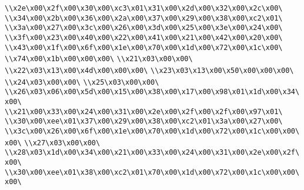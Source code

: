 \verb|\\x2e\x00\x2f\x00\x30\x00\xc3\x01\x31\x00\x2d\x00\x32\x00\x2c\x00\|\newline
\verb|\\x34\x00\x2b\x00\x36\x00\x2a\x00\x37\x00\x29\x00\x38\x00\xc2\x01\|\newline
\verb|\\x3a\x00\x27\x00\x3c\x00\x26\x00\x3d\x00\x25\x00\x3e\x00\x24\x00\|\newline
\verb|\\x3f\x00\x23\x00\x40\x00\x22\x00\x41\x00\x21\x00\x42\x00\x20\x00\|\newline
\verb|\\x43\x00\x1f\x00\x6f\x00\x1e\x00\x70\x00\x1d\x00\x72\x00\x1c\x00\|\newline
\verb|\\x74\x00\x1b\x00\x00\x00\|\newline
\verb|\\x21\x03\x00\x00\|\newline
\verb|\\x22\x03\x13\x00\x4d\x00\x00\x00\|\newline
\verb|\\x23\x03\x13\x00\x50\x00\x00\x00\|\newline
\verb|\\x24\x03\x00\x00\|\newline
\verb|\\x25\x03\x00\x00\|\newline
\verb|\\x26\x03\x06\x00\x5d\x00\x15\x00\x38\x00\x17\x00\x98\x01\x1d\x00\x34\x00\|\newline
\verb|\\x21\x00\x33\x00\x24\x00\x31\x00\x2e\x00\x2f\x00\x2f\x00\x97\x01\|\newline
\verb|\\x30\x00\xee\x01\x37\x00\x29\x00\x38\x00\xc2\x01\x3a\x00\x27\x00\|\newline
\verb|\\x3c\x00\x26\x00\x6f\x00\x1e\x00\x70\x00\x1d\x00\x72\x00\x1c\x00\x00\x00\|\newline
\verb|\\x27\x03\x00\x00\|\newline
\verb|\\x28\x03\x1d\x00\x34\x00\x21\x00\x33\x00\x24\x00\x31\x00\x2e\x00\x2f\x00\|\newline
\verb|\\x30\x00\xee\x01\x38\x00\xc2\x01\x70\x00\x1d\x00\x72\x00\x1c\x00\x00\x00\|\newline

